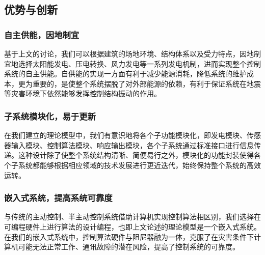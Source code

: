 \subsection{优势与创新}

\subsubsection{自主供能，因地制宜}
基于上文的讨论，我们可以根据建筑的场地环境、结构体系以及受力特点，因地制宜地选择太阳能发电、压电转换、风力发电等一系列发电机制，进而实现整个控制系统的自主供能。自供能的实现一方面有利于减少能源消耗，降低系统的维护成本，更为重要的，是使整个系统摆脱了对外部能源的依赖，有利于保证系统在地震等灾害环境下依然能够发挥控制结构振动的作用。

\subsubsection{子系统模块化，易于更新}
在我们建立的理论模型中，我们有意识地将各个子功能模块化，即发电模块、传感器输入模块、控制算法模块、响应输出模块，各个子系统通过标准接口进行信息传递。这种设计除了使整个系统结构清晰、简便易行之外，模块化的功能封装使得各个子系统都能够根据相应领域的技术发展进行更近迭代，始终保持整个系统的高效运转。

\subsubsection{嵌入式系统，提高系统可靠度}
与传统的主动控制、半主动控制系统借助计算机实现控制算法相区别，我们选择在可编程硬件上进行算法的设计编程，也即上文论述的理论模型是一个嵌入式系统。在我们的嵌入式系统中，控制算法硬件与阻尼器融为一体，克服了在灾害条件下计算机可能无法正常工作、通讯故障的潜在风险，提高了控制系统的可靠度。
